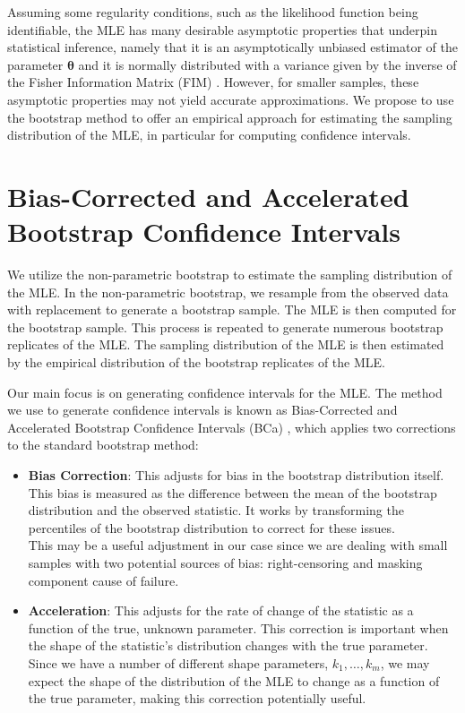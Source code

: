 \documentclass[
]{article}
\theoremstyle{definition}
\theoremstyle{plain}
\theoremstyle{definition}
\theoremstyle{definition}
\theoremstyle{definition}
\theoremstyle{definition}
\theoremstyle{remark}
\begin{document}
Assuming some regularity conditions, such as the likelihood function being
identifiable, the MLE has many desirable asymptotic properties that underpin
statistical inference, namely that it is an asymptotically unbiased estimator
of the parameter \(\boldsymbol{\theta}\) and it is normally distributed with a variance given
by the inverse of the Fisher Information Matrix (FIM) \citep{casella2002statistical}.
However, for smaller samples, these asymptotic properties may not yield accurate
approximations. We propose to use the bootstrap method to offer an empirical
approach for estimating the sampling distribution of the MLE, in particular for
computing confidence intervals.

\hypertarget{boot}{%
\section{Bias-Corrected and Accelerated Bootstrap Confidence Intervals}\label{boot}}

We utilize the non-parametric bootstrap to estimate the sampling distribution
of the MLE. In the non-parametric bootstrap, we resample from the observed data
with replacement to generate a bootstrap sample. The MLE is then computed for
the bootstrap sample. This process is repeated to generate numerous bootstrap
replicates of the MLE. The sampling distribution of the MLE is then estimated
by the empirical distribution of the bootstrap replicates of the MLE.

Our main focus is on generating confidence intervals for the MLE. The method we
use to generate confidence intervals is known as Bias-Corrected and Accelerated
Bootstrap Confidence Intervals (BCa) \citep{efron1987better}, which applies two
corrections to the standard bootstrap method:

\begin{itemize}
\item
  \textbf{Bias Correction}: This adjusts for bias in the bootstrap distribution itself.
  This bias is measured as the difference between the mean of the bootstrap
  distribution and the observed statistic. It works by transforming the
  percentiles of the bootstrap distribution to correct for these issues.\\
  This may be a useful adjustment in our case since we are dealing with
  small samples with two potential sources of bias: right-censoring and
  masking component cause of failure.
\item
  \textbf{Acceleration}: This adjusts for the rate of change of the statistic as a
  function of the true, unknown parameter. This correction is important when the
  shape of the statistic's distribution changes with the true parameter.
  Since we have a number of different shape parameters, \(k_1,\ldots,k_m\), we may
  expect the shape of the distribution of the MLE to change as a function of the
  true parameter, making this correction potentially useful.
\end{itemize}
\end{document}
